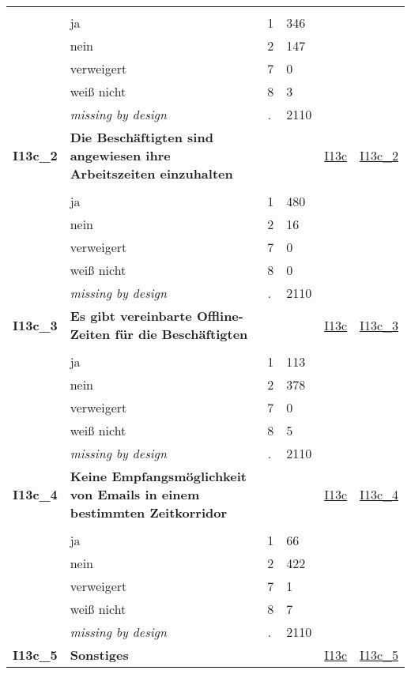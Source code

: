 \begin{longtable}{| L{2.45cm} | L{6cm} | C{1.5cm} | R{1cm} | C{2.25cm} | C{2.25cm} |}
   &  &  &  &  &  \\ 
   & ja & 1 & 346 &  &  \\ 
   & nein & 2 & 147 &  &  \\ 
   & verweigert & 7 & 0 &  &  \\ 
   & weiß nicht & 8 & 3 &  &  \\ 
   & \textit{missing by design} & \textit{.} & 2110 &  &  \\ 
   \midrule
\textbf{I13c\_2}\label{var:I13c:2} & \textbf{Die Beschäftigten sind angewiesen ihre Arbeitszeiten einzuhalten} &  &  & \hyperref[I13c]{I13c} & \hyperref[var:suf:I13c:2]{I13c\_2} \\ 
   &  &  &  &  &  \\ 
   & ja & 1 & 480 &  &  \\ 
   & nein & 2 & 16 &  &  \\ 
   & verweigert & 7 & 0 &  &  \\ 
   & weiß nicht & 8 & 0 &  &  \\ 
   & \textit{missing by design} & \textit{.} & 2110 &  &  \\ 
   \midrule
\textbf{I13c\_3}\label{var:I13c:3} & \textbf{Es gibt vereinbarte Offline-Zeiten für die Beschäftigten} &  &  & \hyperref[I13c]{I13c} & \hyperref[var:suf:I13c:3]{I13c\_3} \\ 
   &  &  &  &  &  \\ 
   & ja & 1 & 113 &  &  \\ 
   & nein & 2 & 378 &  &  \\ 
   & verweigert & 7 & 0 &  &  \\ 
   & weiß nicht & 8 & 5 &  &  \\ 
   & \textit{missing by design} & \textit{.} & 2110 &  &  \\ 
   \midrule
\textbf{I13c\_4}\label{var:I13c:4} & \textbf{Keine Empfangsmöglichkeit von Emails in einem bestimmten Zeitkorridor} &  &  & \hyperref[I13c]{I13c} & \hyperref[var:suf:I13c:4]{I13c\_4} \\ 
   &  &  &  &  &  \\ 
   & ja & 1 & 66 &  &  \\ 
   & nein & 2 & 422 &  &  \\ 
   & verweigert & 7 & 1 &  &  \\ 
   & weiß nicht & 8 & 7 &  &  \\ 
   & \textit{missing by design} & \textit{.} & 2110 &  &  \\ 
   \midrule
\textbf{I13c\_5}\label{var:I13c:5} & \textbf{Sonstiges} &  &  & \hyperref[I13c]{I13c} & \hyperref[var:suf:I13c:5]{I13c\_5} \\ 

\end{longtable}
